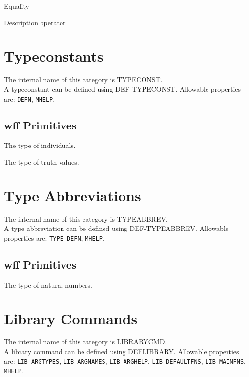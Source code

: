 \begin{description} 
\item[=] \index{=} 
Equality

\item[IOTA]  
Description operator
\item
\end{description}
\chapter{Typeconstants}
The internal name of this category is 
TYPECONST.\\
A typeconstant can be defined using DEF-TYPECONST.
Allowable properties are: \texttt{DEFN}, \texttt{MHELP}.

\section{wff Primitives}

\begin{description} 
\item[I]  
The type of individuals.

\item[O]  
The type of truth values.
\item
\end{description}
\chapter{Type Abbreviations}
The internal name of this category is 
TYPEABBREV.\\
A type abbreviation can be defined using DEF-TYPEABBREV.
Allowable properties are: \texttt{TYPE-DEFN}, \texttt{MHELP}.

\section{wff Primitives}

\begin{description} 
\item[S]  
The type of natural numbers.
\item
\end{description}
\chapter{Library Commands}
The internal name of this category is 
LIBRARYCMD.\\
A library command can be defined using DEFLIBRARY.
Allowable properties are: \texttt{LIB-ARGTYPES}, \texttt{LIB-ARGNAMES}, \texttt{LIB-ARGHELP}, \texttt{LIB-DEFAULTFNS}, \texttt{LIB-MAINFNS}, \texttt{MHELP}.

